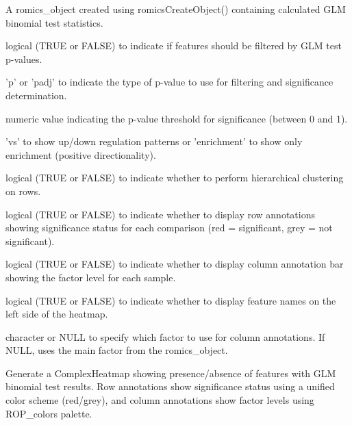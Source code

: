 \documentclass[a4paper]{book}
\begin{document}
%
\begin{Arguments}
\begin{ldescription}
\item[\code{romics\_object}] A romics\_object created using romicsCreateObject() containing calculated GLM binomial test statistics.

\item[\code{filter\_p}] logical (TRUE or FALSE) to indicate if features should be filtered by GLM test p-values.

\item[\code{p\_type}] 'p' or 'padj' to indicate the type of p-value to use for filtering and significance determination.

\item[\code{p}] numeric value indicating the p-value threshold for significance (between 0 and 1).

\item[\code{mode}] 'vs' to show up/down regulation patterns or 'enrichment' to show only enrichment (positive directionality).

\item[\code{hclust\_row}] logical (TRUE or FALSE) to indicate whether to perform hierarchical clustering on rows.

\item[\code{row\_annotation}] logical (TRUE or FALSE) to indicate whether to display row annotations showing significance status for each comparison (red = significant, grey = not significant).

\item[\code{column\_annotation}] logical (TRUE or FALSE) to indicate whether to display column annotation bar showing the factor level for each sample.

\item[\code{show\_rownames}] logical (TRUE or FALSE) to indicate whether to display feature names on the left side of the heatmap.

\item[\code{factor}] character or NULL to specify which factor to use for column annotations. If NULL, uses the main factor from the romics\_object.
\end{ldescription}
\end{Arguments}
%
\begin{Details}
Generate a ComplexHeatmap showing presence/absence of features with GLM binomial test results. Row annotations show significance status using a unified color scheme (red/grey), and column annotations show factor levels using ROP\_colors palette.
\end{Details}
\end{document}

